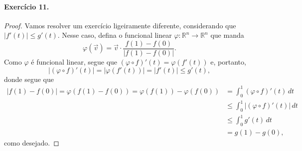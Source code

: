 \documentclass[12pt,a4paper]{article}
\newcommand{\R}{\mathbb{R}}
\newcommand{\N}{\mathbb{N}}
\begin{document}
\paragraph{Exercício 11.}
    \begin{proof}
        
        Vamos resolver um exercício ligeiramente diferente, considerando que $|f'(t)| \leq g'(t)$.
        Nesse caso, defina o funcional linear $\varphi:\R^n \to\R^n$ que manda
        \begin{equation*}
            \varphi(\vec{v}) = \vec{v}\cdot\frac{f(1) - f(0)}{|f(1) - f(0)|}.
        \end{equation*}
        Como $\varphi$ é funcional linear, segue que $(\varphi\circ f)'(t) = \varphi(f'(t))$ e,
        portanto,
        \begin{equation*}
            |(\varphi\circ f)'(t)| = |\varphi(f'(t))| = |f'(t)| \leq g'(t),
        \end{equation*}
        donde segue que
        \begin{align*}
            |f(1) - f(0)| = \varphi(f(1) - f(0)) = \varphi(f(1)) - \varphi(f(0))
                                                 &= \int_0^1 (\varphi\circ f)'(t) \, dt \\
                                                 &\leq \int_0^1 |(\varphi\circ f)'(t)| \, dt \\
                                                 &\leq \int_0^1 g'(t) \, dt \\
                                                 &= g(1) - g(0),
        \end{align*}
        como desejado.
    \end{proof}
\end{document}
